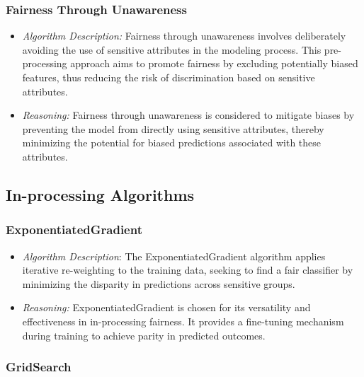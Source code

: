 \subsubsection{Fairness Through Unawareness}

\begin{itemize}

    \item \emph{Algorithm Description:} Fairness through unawareness involves deliberately avoiding the use of sensitive attributes in the modeling process. This pre-processing approach aims to promote fairness by excluding potentially biased features, thus reducing the risk of discrimination based on sensitive attributes.

    \item \emph{Reasoning:} Fairness through unawareness is considered to mitigate biases by preventing the model from directly using sensitive attributes, thereby minimizing the potential for biased predictions associated with these attributes.

\end{itemize}

\subsection{In-processing Algorithms}

\subsubsection{ExponentiatedGradient}

\begin{itemize}

    \item \emph{Algorithm Description}: The ExponentiatedGradient algorithm applies iterative re-weighting to the training data, seeking to find a fair classifier by minimizing the disparity in predictions across sensitive groups.

    \item \emph{Reasoning:} ExponentiatedGradient is chosen for its versatility and effectiveness in in-processing fairness. It provides a fine-tuning mechanism during training to achieve parity in predicted outcomes.

\end{itemize}

\subsubsection{GridSearch}

